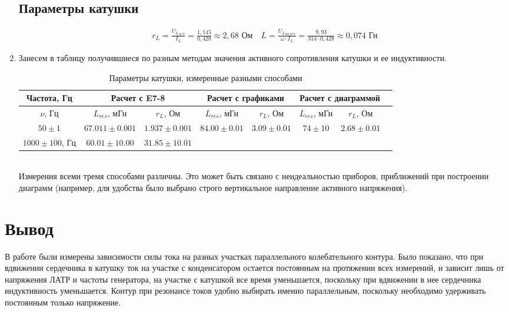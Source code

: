 \documentclass[a4paper, 12pt]{article}
\begin{document}
\begin{enumerate}
    \subsection*{Параметры катушки}
    \begin{align*}
        r_L = \frac{U_{L_{ACT}}}{{I_L}} = \frac{1,145}{0,428} \approx 2,68\text{ Ом} \quad
        L = \frac{U_{L_{REACT}}}{\omega \cdot I_L} = \frac{9,93}{314 \cdot 0,428} \approx 0,074\text{ Гн}
    \end{align*}
    \item Занесем в таблицу получившиеся по разным методам значения активного сопротивления катушки и ее индуктивности.
    \begin{table}[htbp]
        \centering
        \begin{tabular}{|c|c|c|c|c|c|c|c|}
            \hline
            Частота, Гц & \multicolumn{2}{|c|}{Расчет с E7-8} & \multicolumn{2}{|c|}{Расчет с графиками} & \multicolumn{2}{|c|}{Расчет с диаграммой}\\
            \hline
            $\nu$, Гц & $L_{res}$, мГн & $r_{L}$, Ом &  $L_{res}$, мГн & $r_{L}$, Ом & $L_{res}$, мГн & $r_{L}$, Ом\\
            $50\pm 1$ & $67.011\pm 0.001$ & $1.937\pm 0.001$ & $84.00\pm 0.01$ & $3.09\pm 0.01$ & $74\pm 10$ & $2.68\pm 0.01$\\
            $1000\pm 100$, Гц & $60.01\pm 10.00$ & $31.85\pm 10.01$\\
            \hline
        \end{tabular}
        \caption{Параметры катушки, измеренные разными способами}
        \label{Параметры катушки, измеренные разными способами}
    \end{table}\\
    Измерения всеми тремя способами различны. Это может быть связано с неидеальностью приборов, приближений при построении диаграмм (например, для удобства было выбрано строго вертикальное направление
    активного напряжения).
\end{enumerate}
\section*{Вывод}
В работе были измерены зависимости силы тока на разных участках параллельного колебательного контура. 
Было показано, что при вдвижении сердечника в катушку ток на участке с конденсатором остается постоянным на протяжении всех измерений, и зависит лишь от напряжения ЛАТР и частоты генератора, на участке с катушкой все время уменьшается, поскольку при вдвижении в нее
сердечника индуктивность уменьшается.
Контур при резонансе токов удобно выбирать именно параллельным, поскольку необходимо удерживать постоянным только напряжение.
\end{document}
